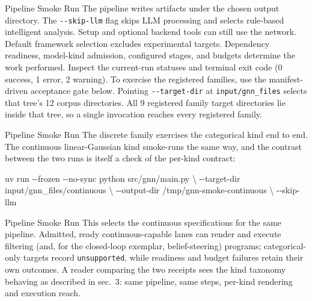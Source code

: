 \documentclass[
  ignorenonframetext,
]{beamer}
\newenvironment{Shaded}{}{}
\newcommand{\AttributeTok}[1]{\textcolor[rgb]{0.49,0.56,0.16}{#1}}
\newcommand{\DataTypeTok}[1]{\textcolor[rgb]{0.56,0.13,0.00}{#1}}
\newcommand{\ExtensionTok}[1]{#1}
\newcommand{\NormalTok}[1]{#1}
\begin{document}
\begin{frame}{Pipeline Smoke Run}
The pipeline writes artifacts under the chosen output directory. The
\texttt{-\/-skip-llm} flag skips LLM processing and selects rule-based
intelligent analysis. Setup and optional backend tools can still use the
network. Default framework selection excludes experimental targets.
Dependency readiness, model-kind admission, configured stages, and
budgets determine the work performed. Inspect the current-run statuses
and terminal exit code (0 success, 1 error, 2 warning). To exercise the
registered families, use the manifest-driven acceptance gate below.
Pointing \texttt{-\/-target-dir} at \texttt{input/gnn\_files} selects
that tree's 12 corpus directories. All 9 registered family target
directories lie inside that tree, so a single invocation reaches every
registered family.

\end{frame}

\begin{frame}{Pipeline Smoke Run}
The discrete family exercises the categorical kind end to end. The
continuous linear-Gaussian kind smoke-runs the same way, and the
contrast between the two runs is itself a check of the per-kind
contract:

\begin{Shaded}
\begin{Highlighting}[]
\ExtensionTok{uv}\NormalTok{ run }\AttributeTok{{-}{-}frozen} \AttributeTok{{-}{-}no{-}sync}\NormalTok{ python src/gnn/main.py }\DataTypeTok{\textbackslash{}}
  \AttributeTok{{-}{-}target{-}dir}\NormalTok{ input/gnn\_files/continuous }\DataTypeTok{\textbackslash{}}
  \AttributeTok{{-}{-}output{-}dir}\NormalTok{ /tmp/gnn{-}smoke{-}continuous }\DataTypeTok{\textbackslash{}}
  \AttributeTok{{-}{-}skip{-}llm}
\end{Highlighting}
\end{Shaded}

\end{frame}

\begin{frame}{Pipeline Smoke Run}
This selects the continuous specifications for the same pipeline.
Admitted, ready continuous-capable lanes can render and execute
filtering (and, for the closed-loop exemplar, belief-steering) programs;
categorical-only targets record \texttt{unsupported}, while readiness
and budget failures retain their own outcomes. A reader comparing the
two receipts sees the kind taxonomy behaving as described in
sec.~3: same pipeline, same steps, per-kind
rendering and execution reach.
\end{frame}
\end{document}
